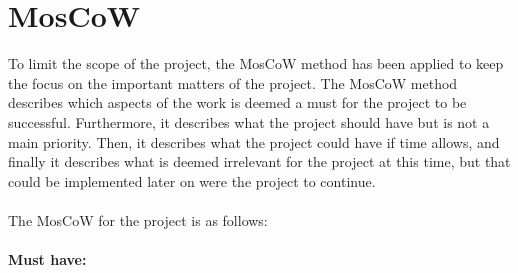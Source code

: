 \section{MosCoW}\label{section:moscow}
To limit the scope of the project, the MosCoW method has been applied to keep the focus on the important matters of the project. 
The MosCoW method describes which aspects of the work is deemed a must for the project to be successful. 
Furthermore, it describes what the project should have but is not a main priority. 
Then, it describes what the project could have if time allows, and finally it describes what is deemed irrelevant for the project at this time, but that could be implemented later on were the project to continue. 
\\\\
The MosCoW for the project is as follows:
\\\\
\noindent\textbf{Must have:}

